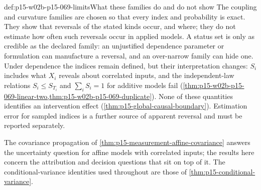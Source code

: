 \begin{hbwarning}{def:p15-w02b-p15-069-limits}{What these families do and do not show}
The coupling and curvature families are chosen so that every index and
probability is exact. They show that reversals of the stated kinds occur,
and where; they do not estimate how often such reversals occur in applied
models. A status set is only as credible as the declared family: an
unjustified dependence parameter or formulation can manufacture a reversal,
and an over-narrow family can hide one. Under dependence the indices remain
defined, but their interpretation changes: \(S_i\) includes what \(X_i\)
reveals about correlated inputs, and the independent-law relations
\(S_i\leq S_{T_i}\) and \(\sum_iS_i=1\) for additive models fail
(\cref{thm:p15-w02b-p15-069-linear-two,thm:p15-w02b-p15-069-duplicate}).
None of these quantities identifies an intervention effect
(\cref{thm:p15-global-causal-boundary}). Estimation error for sampled
indices is a further source of apparent reversal and must be reported
separately.
\end{hbwarning}

The covariance propagation of \cref{thm:p15-measurement-affine-covariance}
answers the uncertainty question for affine models with correlated inputs;
the results here concern the attribution and decision questions that sit on
top of it. The conditional-variance identities used throughout are those of
\cref{thm:p15-conditional-variance}.
